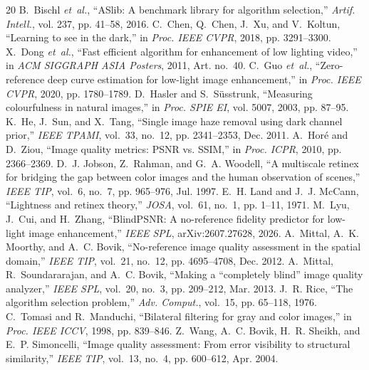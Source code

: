 \documentclass[journal]{IEEEtran}
\begin{document}
\renewcommand{\footnotesize}{\fontsize{7.5pt}{8.5pt}\selectfont}

\begin{thebibliography}{20}
\footnotesize
\setlength{\itemsep}{-2.2pt}
\setlength{\parskip}{0pt}
B.~Bischl \emph{et~al.}, ``ASlib: A benchmark library for algorithm selection,'' \emph{Artif. Intell.}, vol. 237, pp. 41--58, 2016.
C.~Chen, Q.~Chen, J.~Xu, and V.~Koltun, ``Learning to see in the dark,'' in \emph{Proc. IEEE CVPR}, 2018, pp. 3291--3300.
X.~Dong \emph{et~al.}, ``Fast efficient algorithm for enhancement of low lighting video,'' in \emph{ACM SIGGRAPH ASIA Posters}, 2011, Art. no.~40.
C.~Guo \emph{et~al.}, ``Zero-reference deep curve estimation for low-light image enhancement,'' in \emph{Proc. IEEE CVPR}, 2020, pp. 1780--1789.
D.~Hasler and S.~S{\"u}sstrunk, ``Measuring colourfulness in natural images,'' in \emph{Proc. SPIE EI}, vol. 5007, 2003, pp. 87--95.
K.~He, J.~Sun, and X.~Tang, ``Single image haze removal using dark channel prior,'' \emph{IEEE TPAMI}, vol.~33, no.~12, pp. 2341--2353, Dec. 2011.
A.~Hor{\'e} and D.~Ziou, ``Image quality metrics: PSNR vs. SSIM,'' in \emph{Proc. ICPR}, 2010, pp. 2366--2369.
D.~J. Jobson, Z.~Rahman, and G.~A. Woodell, ``A multiscale retinex for bridging the gap between color images and the human observation of scenes,'' \emph{IEEE TIP}, vol.~6, no.~7, pp. 965--976, Jul. 1997.
E.~H. Land and J.~J. McCann, ``Lightness and retinex theory,'' \emph{JOSA}, vol.~61, no.~1, pp. 1--11, 1971.
M.~Lyu, J.~Cui, and H.~Zhang, ``BlindPSNR: A no-reference fidelity predictor for low-light image enhancement,'' \emph{IEEE SPL}, arXiv:2607.27628, 2026.
A.~Mittal, A.~K. Moorthy, and A.~C. Bovik, ``No-reference image quality assessment in the spatial domain,'' \emph{IEEE TIP}, vol.~21, no.~12, pp. 4695--4708, Dec. 2012.
A.~Mittal, R.~Soundararajan, and A.~C. Bovik, ``Making a ``completely blind'' image quality analyzer,'' \emph{IEEE SPL}, vol.~20, no.~3, pp. 209--212, Mar. 2013.
J.~R. Rice, ``The algorithm selection problem,'' \emph{Adv. Comput.}, vol.~15, pp. 65--118, 1976.
C.~Tomasi and R.~Manduchi, ``Bilateral filtering for gray and color images,'' in \emph{Proc. IEEE ICCV}, 1998, pp. 839--846.
Z.~Wang, A.~C. Bovik, H.~R. Sheikh, and E.~P. Simoncelli, ``Image quality assessment: From error visibility to structural similarity,'' \emph{IEEE TIP}, vol.~13, no.~4, pp. 600--612, Apr. 2004.

\end{thebibliography}
\end{document}
